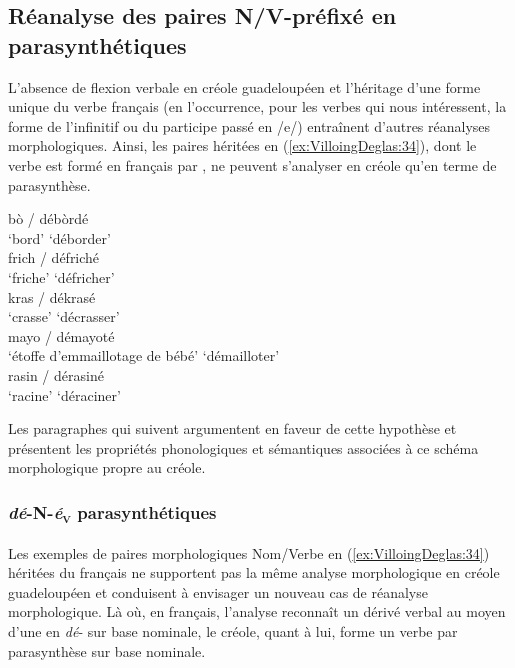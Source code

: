 \documentclass[output=paper]{langsci/langscibook}
\begin{document}
\subsection{Réanalyse des paires N/V-préfixé en
parasynthétiques}\label{subsection:VilloingDeglas:réanalyse-des-paires-nv-de-préfixé-en-parasynthétiques}
L'absence de flexion verbale en créole guadeloupéen et l'héritage d'une
forme unique du verbe français (en l'occurrence, pour les verbes qui
nous intéressent, la forme de l'infinitif ou du participe passé en /e/)
entraînent d'autres réanalyses morphologiques. Ainsi, les paires héritées
en (\ref{ex:VilloingDeglas:34}), dont le verbe est formé en français par , ne peuvent
s'analyser en créole qu'en terme de parasynthèse.

\ea \label{ex:VilloingDeglas:34}
      \ea \gll bò / débòrdé\\
        {`bord'} {} {`déborder'}\\
      \ex \gll  frich / défriché\\
        {`friche'} {} {`défricher'}\\
      \ex \gll  kras / dékrasé\\
        {`crasse'} {} {`décrasser'}\\
      \ex \gll  mayo / démayoté\\
        {`étoffe d'emmaillotage de bébé'} {} {`démailloter'}\\
      \ex \gll  rasin / dérasiné\\
        {`racine'} {} {`déraciner'}\\
      \z
\z

Les paragraphes qui suivent argumentent en faveur de cette hypothèse et
présentent les propriétés phonologiques et sémantiques associées à ce
schéma morphologique  propre au créole.

\subsubsection{\texorpdfstring{\emph{dé}-N-\emph{é}\textsubscript{\textsc{v}} parasynthétiques
}{Dé-N-éV parasynthétiques }}\label{dé-n-év-parasynthétiques}

Les exemples de paires morphologiques Nom/Verbe en (\ref{ex:VilloingDeglas:34}) héritées du
français ne supportent pas la même analyse morphologique en créole
guadeloupéen et conduisent à envisager un nouveau cas de réanalyse
morphologique. Là où, en français, l'analyse reconnaît un dérivé verbal
au moyen d'une  en \emph{dé}- sur base nominale, le créole,
quant à lui, forme un verbe par parasynthèse sur base nominale.
\end{document}
